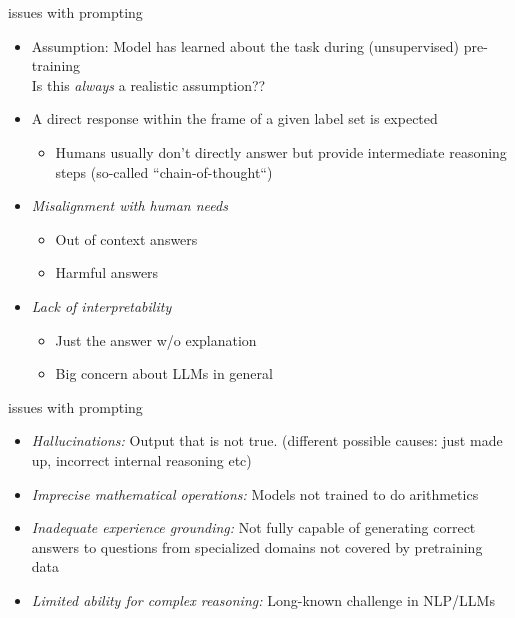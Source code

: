 \begin{frame}{issues with prompting}

\vfill

\begin{itemize}
    \item Assumption: Model has learned about the task during (unsupervised) pre-training \\ \ques Is this \textit{always} a realistic assumption??
    \item A direct response within the frame of a given label set is expected
    \begin{itemize}
        \item Humans usually don't directly answer but provide intermediate reasoning steps (so-called ``chain-of-thought``)
    \end{itemize}
    \item \textit{Misalignment with human needs}
    \begin{itemize}
        \item Out of context answers
        \item Harmful answers
    \end{itemize}
    \item \textit{Lack of interpretability}
    \begin{itemize}
        \item Just the answer w/o explanation
        \item Big concern about LLMs in general
    \end{itemize}
\end{itemize}

\vfill

\end{frame}


\begin{vbframe}{issues with prompting}

\vfill

\begin{itemize}
    \item \textit{Hallucinations:} Output that is not true.
(different possible causes: just made up,
incorrect internal reasoning etc)
    \item \textit{Imprecise mathematical operations:} Models not trained to do arithmetics
    \item \textit{Inadequate experience grounding:} Not
    fully capable of generating correct answers to questions
    from specialized domains not covered by pretraining data
    \item \textit{Limited ability for complex reasoning:} Long-known challenge in NLP/LLMs
\end{itemize}

\vfill

\end{vbframe}

